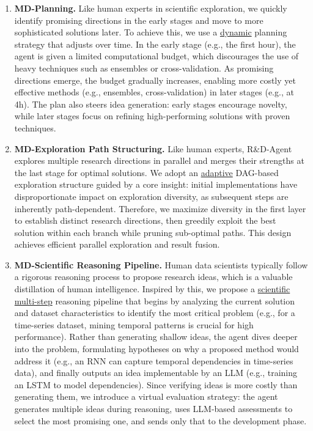 \begin{enumerate}[leftmargin=4ex]
\item [\ding{182}] \textbf{MD-Planning.}
Like human experts in scientific exploration, we quickly identify promising directions in the early stages and move to more sophisticated solutions later. To achieve this, we use a \uline{dynamic} planning strategy that adjusts over time. In the early stage (e.g., the first hour), the agent is given a limited computational budget, which discourages the use of heavy techniques such as ensembles or cross-validation. As promising directions emerge, the budget gradually increases, enabling more costly yet effective methods (e.g., ensembles, cross-validation) in later stages (e.g., at 4h). The plan also steers idea generation: early stages encourage novelty, while later stages focus on refining high-performing solutions with proven techniques.

\item [\ding{183}] \textbf{MD-Exploration Path Structuring.} 
Like human experts, R\&D-Agent explores multiple research directions in parallel and merges their strengths at the last stage for optimal solutions. We adopt an \uline{adaptive} DAG-based exploration structure guided by a core insight: initial implementations have disproportionate impact on exploration diversity, as subsequent steps are inherently path-dependent. Therefore, we maximize diversity in the first layer to establish distinct research directions, then greedily exploit the best solution within each branch while pruning sub-optimal paths. This design achieves efficient parallel exploration and result fusion.

\item [\ding{184}] \textbf{MD-Scientific Reasoning Pipeline.} Human data scientists typically follow a rigorous reasoning process to propose research ideas, which is a valuable distillation of human intelligence. Inspired by this, we propose a \uline{scientific multi-step} reasoning pipeline that begins by analyzing the current solution and dataset characteristics to identify the most critical problem (e.g., for a time-series dataset, mining temporal patterns is crucial for high performance). Rather than generating shallow ideas, the agent dives deeper into the problem, formulating hypotheses on why a proposed method would address it (e.g., an RNN can capture temporal dependencies in time-series data), and finally outputs an idea implementable by an LLM (e.g., training an LSTM\cite{graves2012long} to model dependencies). Since verifying ideas is more costly than generating them, we introduce a virtual evaluation strategy: the agent generates multiple ideas during reasoning, uses LLM-based assessments to select the most promising one, and sends only that to the development phase.


\end{enumerate}
